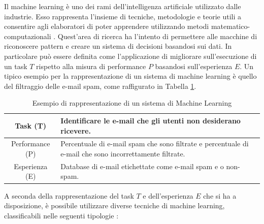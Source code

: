 Il machine learning è uno dei rami dell'intelligenza artificiale utilizzato dalle industrie. Esso rappresenta l'insieme di tecniche, metodologie e teorie utili a consentire agli elaboratori di poter apprendere utilizzando metodi matematico-computazionali \cite{Michalski1984MachineL}.
Quest'area di ricerca ha l'intento di permettere alle macchine di riconoscere pattern e creare un sistema di decisioni basandosi sui dati.
In particolare può essere definita come l'applicazione di migliorare sull'esecuzione di un task $T$ rispetto alla misura di performance $P$ basandosi sull'esperienza $E$.
Un tipico esempio per la rappresentazione di un sistema di machine learning è quello del filtraggio delle e-mail spam, come raffigurato in Tabella \ref{tab:spam_example}.


\begin{table}[]
    \centering
    \begin{tabular}{|c|p{7cm}|}
        \hline
         Task (T) & Identificare le e-mail che gli utenti non desiderano ricevere.  \\
         \hline
         Performance (P) & Percentuale di e-mail spam che sono filtrate e percentuale di e-mail che sono incorrettamente filtrate.\\
         \hline
         Esperienza (E) & Database di e-mail etichettate come e-mail spam e o non-spam.\\
        \hline
    \end{tabular}
    \caption{Esempio di rappresentazione di un sistema di Machine Learning}
    \label{tab:spam_example}
\end{table}
A seconda della rappresentazione del task $T$ e dell'esperienza $E$ che si ha a disposizione, è possibile utilizzare diverse tecniche di machine learning, classificabili nelle seguenti tipologie \cite{lecun2015deep}:
